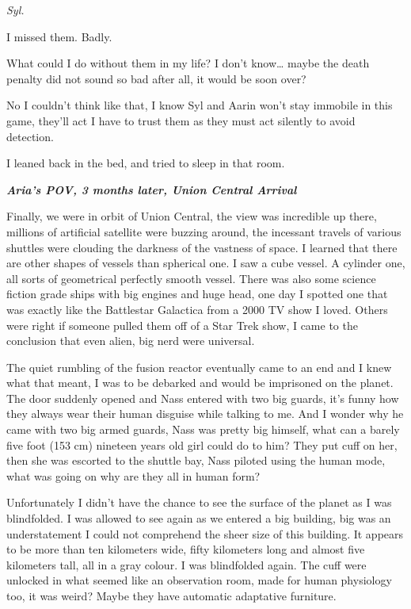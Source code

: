 \documentclass[colorlinks,12pt,a4paper]{book}
\begin{document}
\textit{Syl.}\par
\bigskip

I missed them. Badly. \par
\bigskip

What could I do without them in my life? I don't know… maybe the death penalty did not sound so bad after all, it would 
be soon over?\par
\bigskip

No I couldn't think like that, I know Syl and Aarin won't stay immobile in this game, they'll act I have to trust them as 
they must act silently to avoid detection.\par
\bigskip

I leaned back in the bed, and tried to sleep in that room.\par
\bigskip

\textit{\textbf{Aria's POV, 3 months later, Union Central Arrival}}\par
\bigskip

Finally, we were in orbit of Union Central, the view was incredible up there, millions of artificial satellite were 
buzzing around, the incessant travels of various shuttles were clouding the darkness of the vastness of space. 
I learned that there are other shapes of vessels than spherical one. I saw a cube vessel. A cylinder one, all sorts 
of geometrical perfectly smooth vessel. There was also some science fiction grade ships with big engines and huge head, 
one day I spotted one that was exactly like the Battlestar Galactica from a 2000 TV show I loved. Others were right if 
someone pulled them off of a Star Trek show, I came to the conclusion that even alien, big nerd were universal.\par
\bigskip

The quiet rumbling of the fusion reactor eventually came to an end and I knew what that meant, I was to be debarked 
and would be imprisoned on the planet. The door suddenly opened and Nass entered with two big guards, it's funny how they 
always wear their human disguise while talking to me. And I wonder why he came with two big armed guards, Nass was pretty 
big himself, what can a barely five foot (153 cm) nineteen years old girl could do to him? They put cuff on her, then she was 
escorted to the shuttle bay, Nass piloted using the human mode, what was going on why are they all in human form?\par
\bigskip

Unfortunately I didn't have the chance to see the surface of the planet as I was blindfolded. 
I was allowed to see again as we entered a big building, big was an understatement I could not comprehend the sheer size of this building. 
It appears to be more than ten kilometers wide, fifty kilometers long and almost five kilometers tall, all in a gray 
colour. I was blindfolded again. The cuff were unlocked in what seemed like an observation room, made for 
human physiology too, it was weird? Maybe they have automatic adaptative furniture. \par
\bigskip
\end{document}
